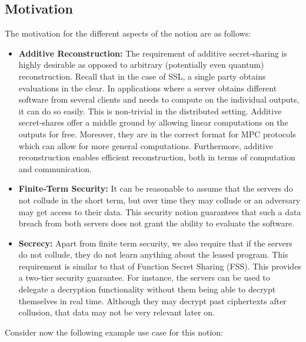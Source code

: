 \subsection{Motivation}

The motivation for the different aspects of the notion are as
follows:

\begin{itemize} \item \textbf{Additive Reconstruction:} The 
requirement of additive secret-sharing is highly desirable as
opposed to arbitrary (potentially even quantum) reconstruction.
Recall that in the case of SSL, a single party obtains evaluations
in the clear.  In applications where a server obtains different
software from several clients and needs to compute on the individual
outputs, it can do so easily. This is non-trivial in the distributed
setting. Additive secret-shares offer a middle ground by allowing
linear computations on the outputs for free. Moreover, they are in
the correct format for MPC protocols which can allow for more
general computations.  Furthermore, additive reconstruction enables
efficient reconstruction, both in terms of computation and
communication.

\item \textbf{Finite-Term Security:} It can be
reasonable to assume that the servers do not collude in the short
term, but over time they may collude or an adversary may
get access to their data. This security notion guarantees that such
a data breach from both servers does not grant the ability to
evaluate the software.

\item \textbf{Secrecy:} Apart from finite term security, we also
require that if the servers do not collude, they do not learn
anything about the leased program. This requirement is similar to
that of Function Secret Sharing (FSS). This provides a two-tier
security guarantee. For instance, the servers can be used to
delegate a decryption functionality without them being able to
decrypt themselves in real time. Although they may decrypt past
ciphertexts after collusion, that data may not be very relevant
later on.  \end{itemize}

Consider now the following example use case for this notion:

